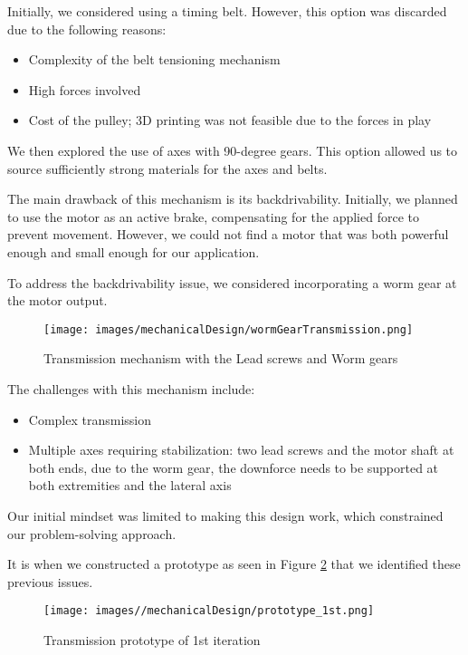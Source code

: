 \documentclass[lettersize,journal]{IEEEtran}
\begin{document}
Initially, we considered using a timing belt. However, this option was discarded due to the following reasons:
\begin{itemize}
    \item Complexity of the belt tensioning mechanism
    \item High forces involved
    \item Cost of the pulley; 3D printing was not feasible due to the forces in play
\end{itemize}

We then explored the use of axes with 90-degree gears. This option allowed us to source sufficiently strong materials for the axes and belts.

The main drawback of this mechanism is its backdrivability. Initially, we planned to use the motor as an active brake, compensating for the applied force to prevent movement. However, we could not find a motor that was both powerful enough and small enough for our application.

To address the backdrivability issue, we considered incorporating a worm gear at the motor output.

\begin{figure}[ht]
\centering
\texttt{[image: images/mechanicalDesign/wormGearTransmission.png]}
\caption{Transmission mechanism with the Lead screws and Worm gears}
\label{optionCTransmission}
\end{figure}



The challenges with this mechanism include:
\begin{itemize}
    \item Complex transmission
    \item Multiple axes requiring stabilization: two lead screws and the motor shaft at both ends, due to the worm gear, the downforce needs to be supported at both extremities and the lateral axis
\end{itemize}
    
    

Our initial mindset was limited to making this design work, which constrained our problem-solving approach.

It is when we constructed a prototype as seen in Figure \ref{fig:Transmission prototype} that we identified these previous issues.
\begin{figure} [ht]
    \centering
    \texttt{[image: images//mechanicalDesign/prototype\_1st.png]}
    \caption{Transmission prototype of 1st iteration}
    \label{fig:Transmission prototype}
\end{figure}
\end{document}
